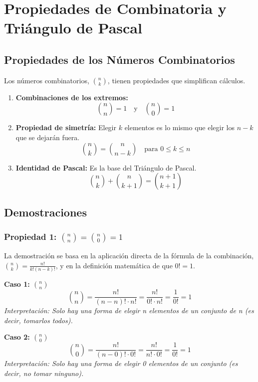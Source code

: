 \documentclass[12pt, letterpaper]{article}
\begin{document}
\section{Propiedades de Combinatoria y Triángulo de Pascal}
\subsection{Propiedades de los Números Combinatorios}
Los números combinatorios, $\binom{n}{k}$, tienen propiedades que simplifican cálculos.
\begin{enumerate}
	\item \textbf{Combinaciones de los extremos:}
	      \[ \binom{n}{n} = 1 \quad \text{y} \quad \binom{n}{0} = 1 \]

	\item \textbf{Propiedad de simetría:} Elegir $k$ elementos es lo mismo que elegir los $n-k$ que se dejarán fuera.
	      \[ \binom{n}{k} = \binom{n}{n-k} \quad \text{para } 0 \le k \le n \]

	\item \textbf{Identidad de Pascal:} Es la base del Triángulo de Pascal.
	      \[ \binom{n}{k} + \binom{n}{k+1} = \binom{n+1}{k+1} \]
\end{enumerate}

\subsection{Demostraciones}
\subsubsection{\texorpdfstring{Propiedad 1: $\binom{n}{n} = \binom{n}{0} = 1$}{Propiedad 1: C(n,n) = C(n,0) = 1}}
La demostración se basa en la aplicación directa de la fórmula de la combinación, $\binom{n}{k} = \frac{n!}{k!(n-k)!}$, y en la definición matemática de que $0! = 1$.

\vspace{1em}
\noindent \textbf{Caso 1: $\binom{n}{n}$}
\[ \binom{n}{n} = \frac{n!}{(n-n)! \cdot n!} = \frac{n!}{0! \cdot n!} = \frac{1}{0!} = 1 \]
\textit{Interpretación: Solo hay una forma de elegir n elementos de un conjunto de n (es decir, tomarlos todos).}

\vspace{1em}
\noindent \textbf{Caso 2: $\binom{n}{0}$}
\[ \binom{n}{0} = \frac{n!}{(n-0)! \cdot 0!} = \frac{n!}{n! \cdot 0!} = \frac{1}{0!} = 1 \]
\textit{Interpretación: Solo hay una forma de elegir 0 elementos de un conjunto (es decir, no tomar ninguno).}
\end{document}
